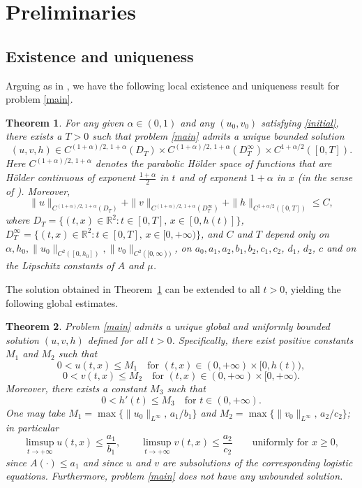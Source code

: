 \documentclass[reqno]{amsart}
\newcommand{\rev}[1]{#1}
\theoremstyle{plain}
\newtheorem{theorem}{Theorem}
\theoremstyle{definition}
\theoremstyle{remark}
\begin{document}
	\section{Preliminaries}\label{sec_2}
	
	\subsection{Existence and uniqueness}
	
	Arguing as in \cite{MR3327894}, we have the following local existence and uniqueness
	result for problem \eqref{main}.
	
	\begin{theorem}\label{th:existence}
		For any given $\alpha \in (0, 1)$ and any $(u_0, v_0)$ satisfying \eqref{initial},
		there exists a $T > 0$ such that problem \eqref{main} admits a unique bounded
		solution
		\[
		(u, v, h)
		\in C^{(1+\alpha)/2,\,1+\alpha}(D_T)
		\times C^{(1+\alpha)/2,\,1+\alpha}(D_T^{\infty})
		\times C^{1+\alpha/2}([0,T]).
		\]
		Here $C^{(1+\alpha)/2,\,1+\alpha}$ denotes the parabolic H\"{o}lder
		space of functions that are H\"{o}lder continuous of exponent $\tfrac{1+\alpha}{2}$
		in $t$ and of exponent $1+\alpha$ in $x$ (in the sense of
		\cite[Chapter~IV]{MR241821}).
		Moreover,
		\[
		\|u\|_{C^{(1+\alpha)/2,\,1+\alpha}(D_T)}
		+ \|v\|_{C^{(1+\alpha)/2,\,1+\alpha}(D_T^{\infty})}
		+ \|h\|_{C^{1+\alpha/2}([0,T])} \leq C,
		\]
		where
		$D_T = \{(t,x) \in \mathbb{R}^2 : t \in [0,T],\, x \in [0, h(t)]\}$,
		$D_T^{\infty} = \{(t,x) \in \mathbb{R}^2 : t \in [0,T],\, x \in [0, +\infty)\}$,
		and $C$ and $T$ depend only on $\alpha, h_0, \|u_0\|_{C^2([0,h_0])},
		\|v_0\|_{C^2([0,\infty))}$, on $a_0, a_1, a_2, b_1, b_2, c_1, c_2$\rev{, $d_1$, $d_2$, $c$ and on the Lipschitz constants of $A$ and $\mu$}.
	\end{theorem}
	
	The solution obtained in Theorem~\ref{th:existence} can be extended to all $t > 0$, yielding the following global estimates.
	
	\begin{theorem}\label{th:bounds}
		Problem \eqref{main} admits a unique global and uniformly bounded solution $(u,v,h)$ defined for all $t > 0$. Specifically, there exist positive constants $M_1$ and $M_2$ such that
		\[
		0 < u(t,x) \leq M_1
		\quad\text{for }(t, x) \in (0, +\infty) \times [0, h(t)),
		\]
		\[
		0 < v(t,x) \leq M_2
		\quad\text{for }(t, x) \in (0, +\infty) \times [0, +\infty).
		\]
		Moreover, there exists a constant $M_3$ such that
		\[
		0 < h'(t) \leq M_3 \quad\text{for } t \in (0,+\infty).
		\]
		\rev{One may take $M_1=\max\{\|u_0\|_{L^\infty},\,a_1/b_1\}$ and
		$M_2=\max\{\|v_0\|_{L^\infty},\,a_2/c_2\}$; in particular
		\[
		\limsup_{t\to+\infty}u(t,x)\le \frac{a_1}{b_1},\qquad
		\limsup_{t\to+\infty}v(t,x)\le \frac{a_2}{c_2}
		\qquad\text{uniformly for }x\ge0,
		\]
		since $A(\cdot)\le a_1$ and since $u$ and $v$ are subsolutions of the
		corresponding logistic equations.}
		Furthermore, problem \eqref{main} does not have any unbounded solution.
	\end{theorem}
	
\end{document}
